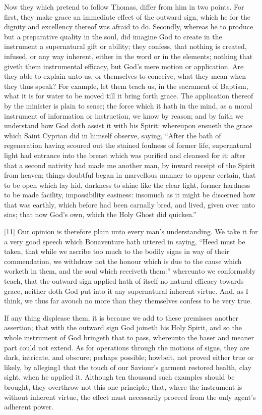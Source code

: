 Now they which pretend to follow Thomas, differ from him in two points. For first, they make grace an immediate effect of the outward sign, which he for the dignity and excellency thereof was afraid to do. Secondly, whereas he to produce but a preparative quality in the soul, did imagine God to create in the instrument a supernatural gift or ability; they confess, that nothing is created, infused, or any way inherent, either in the word or in the elements; nothing that giveth them instrumental efficacy, but God’s mere motion or application. Are they able to explain unto us, or themselves  to conceive, what they mean when they thus speak? For example, let them teach us, in the sacrament of Baptism, what it is for water to be moved till it bring forth grace. The application thereof by the minister is plain to sense; the force which it hath in the mind, as a moral instrument of information or instruction, we know by reason; and by faith we understand how God doth assist it with his Spirit: whereupon ensueth the grace which Saint Cyprian did in himself observe, saying, “After the bath of regeneration having scoured out the stained foulness of former life, supernatural light had entrance into the breast which was purified and cleansed for it: after that a second nativity had made me another man, by inward receipt of the Spirit from heaven; things doubtful began in marvellous manner to appear certain, that to be open which lay hid, darkness to shine like the clear light, former hardness to be made facility, impossibility easiness: insomuch as it might be discerned how that was earthly, which before had been carnally bred, and lived, given over unto sins; that now God’s own, which the Holy Ghost did quicken.”

[11] Our opinion is therefore plain unto every man’s understanding. We take it for a very good speech which Bonaventure hath uttered in saying, “Heed must be taken, that while we ascribe too much to the bodily signs in way of their commendation, we withdraw not the honour which is due to the cause which worketh in them, and the soul which receiveth them:” whereunto we conformably teach, that the outward sign applied hath of itself no natural efficacy towards grace, neither doth God put into it any supernatural  inherent virtue. And, as I think, we thus far avouch no more than they themselves confess to be very true.

If any thing displease them, it is because we add to these premisses another assertion; that with the outward sign God joineth his Holy Spirit, and so the whole instrument of God bringeth that to pass, whereunto the baser and meaner part could not extend. As for operations through the motions of signs, they are dark, intricate, and obscure; perhaps possible; howbeit, not proved either true or likely, by alleging1 that the touch of our Saviour’s garment restored health, clay sight, when he applied it. Although ten thousand such examples should be brought, they overthrow not this one principle; that, where the instrument is without inherent virtue, the effect must necessarily proceed from the only agent’s adherent power.

